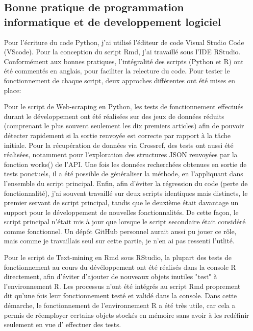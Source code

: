 \documentclass{book}
\begin{document}
\subsection[Bonnes pratiques]{Bonne pratique de programmation informatique et
    de developpement logiciel}
\noindent
Pour l'écriture du code Python, j'ai utilisé l'éditeur de code Visual Studio Code (VScode). Pour la conception du script Rmd, j'ai travaillé sous l'IDE RStudio. Conformément aux bonnes pratiques, l'intégralité des scripts (Python et R) ont été commentés en anglais, pour faciliter la relecture du code. Pour tester le fonctionnement de chaque script, deux approches différentes ont été mises en place: 

Pour le script de Web-scraping en Python, les tests de fonctionnement effectués durant le développement ont été réalisées sur des jeux de données réduits (comprenant le plus souvent seulement les dix premiers articles) afin de pouvoir détecter rapidement si la sortie renvoyée est correcte par rapport à la tâche initiale. Pour la récupération de données via Crossref, des tests ont aussi été réalisées, notamment pour l'exploration des structures JSON renvoyées par la fonction works() de l'API. Une fois les données recherchées obtenues en sortie de tests ponctuels, il a été possible de généraliser la méthode, en l'appliquant dans l'ensemble du script principal. Enfin, afin d'éviter la régression du code (perte de fonctionnalité), j'ai souvent travaillé sur deux scripts identiques mais distincts, le premier servant de script principal, tandis que le deuxième était davantage un support pour le développement de nouvelles fonctionnalités. De cette façon, le script principal n'était mis à jour que lorsque le script secondaire était considéré comme fonctionnel. Un dépôt GitHub personnel aurait aussi pu jouer ce rôle, mais comme je travaillais seul sur cette partie, je n'en ai pas ressenti l'utlité.
    
    
Pour le script de Text-mining en Rmd sous RStudio, la plupart des tests de fonctionnement au cours du dévéloppement ont été réalisés dans la console R directement, afin d'éviter d'ajouter de nouveaux objets inutiles "test" à l'environnement R. Les processus n'ont été intégrés au script Rmd proprement dit qu'une fois leur fonctionnement testé et validé dans la console. Dans cette démarche, le fonctionnement de l'environnement R a été très utile, car cela a permis de réemployer certains objets stockés en mémoire sans avoir à les redéfinir seulement en vue d' effectuer des tests.
\end{document}
